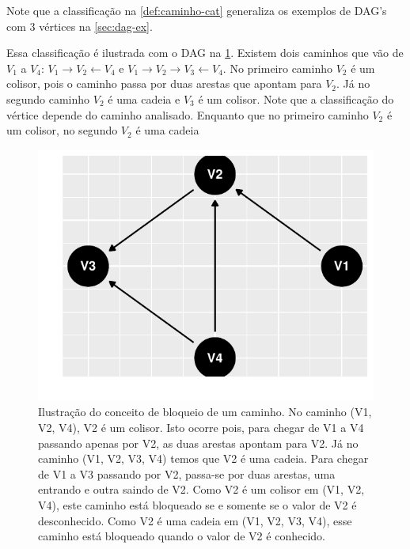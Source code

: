Note que a classificação na \cref{def:caminho-cat}
generaliza os exemplos de DAG's com 3 vértices 
na \cref{sec:dag-ex}. 

Essa classificação é ilustrada com 
o DAG na \cref{fig:caminho-cat}.
Existem dois caminhos que vão de $V_1$ a $V_4$:
$V_1 \rightarrow V_2 \leftarrow V_4$ e
$V_1 \rightarrow V_2 \rightarrow V_3 \leftarrow V_4$.
No primeiro caminho $V_2$ é um colisor, pois
o caminho passa por duas arestas que apontam para $V_2$.
Já no segundo caminho $V_2$ é uma cadeia e
$V_3$ é um colisor.
Note que a classificação do vértice depende 
do caminho analisado.
Enquanto que no primeiro caminho $V_2$ é um colisor,
no segundo $V_2$ é uma cadeia

\begin{knitrout}
\color{fgcolor}\begin{figure}[t]

{\centering \includegraphics[width=\maxwidth]{./figures/caminho-cat-1} 

}

\caption[Ilustração do conceito de bloqueio de um caminho]{Ilustração do conceito de bloqueio de um caminho. No caminho (V1, V2, V4), V2 é um colisor. Isto ocorre pois, para chegar de V1 a V4 passando apenas por V2, as duas arestas apontam para V2. Já no caminho (V1, V2, V3, V4) temos que V2 é uma cadeia. Para chegar de V1 a V3 passando por V2, passa-se por duas arestas, uma entrando e outra saindo de V2. Como V2 é um colisor em (V1, V2, V4), este caminho está bloqueado se e somente se o valor de V2 é desconhecido. Como V2 é uma cadeia em (V1, V2, V3, V4), esse caminho está bloqueado quando o valor de V2 é conhecido.}\label{fig:caminho-cat}
\end{figure}

\end{knitrout}

